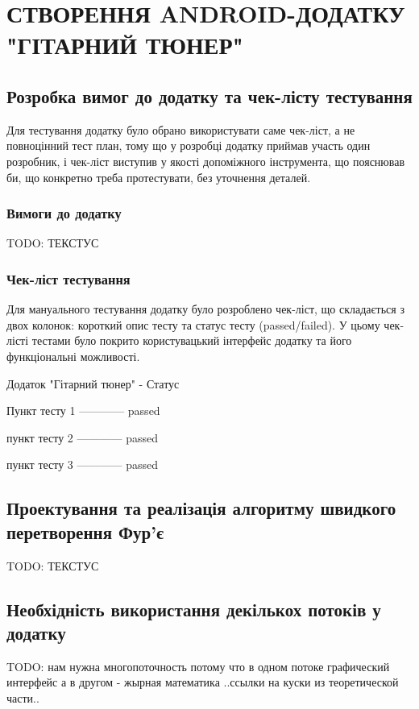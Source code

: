 \section{СТВОРЕННЯ ANDROID-ДОДАТКУ "ГІТАРНИЙ ТЮНЕР"}

\subsection{Розробка вимог до додатку та чек-лісту тестування}

Для тестування додатку було обрано використувати саме чек-ліст, а не повноцінний тест план, тому що у розробці додатку приймав участь один розробник, і чек-ліст виступив у якості допоміжного інструмента, що пояснював би, що конкретно треба протестувати, без уточнення деталей.

\subsubsection{Вимоги до додатку}

TODO: ТЕКСТУС

\subsubsection{Чек-ліст тестування}

Для мануального тестування додатку було розроблено чек-ліст, що складається з двох колонок: короткий опис тесту та статус тесту (passed/failed). У цьому чек-лісті тестами було покрито користувацький інтерфейс додатку та його функціональні можливості.

Додаток "Гітарний тюнер" - Статус

Пункт тесту 1 ------------ passed

пункт тесту 2 ------------ passed

пункт тесту 3 ------------ passed


\subsection{Проектування та реалізація алгоритму швидкого перетворення Фур'є}

TODO: ТЕКСТУС

\subsection{Необхідність використання декількох потоків у додатку}

TODO: нам нужна многопоточность потому что в одном потоке графический интерфейс а в другом - жырная математика
..ссылки на куски из теоретической части..

